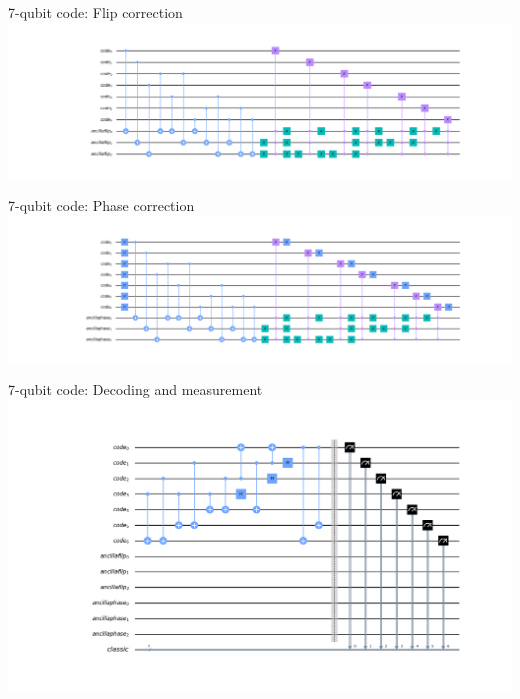 \documentclass{beamer}
\begin{document}
\begin{frame}{7-qubit code: Flip correction}
  \includegraphics[width=\textwidth]{7qb_flip}
\end{frame}

\begin{frame}{7-qubit code: Phase correction}
  \includegraphics[width=\textwidth]{7qb_phase}
\end{frame}

\begin{frame}{7-qubit code: Decoding and measurement}
  \includegraphics[width=\textwidth]{7qb_end}
\end{frame}
\end{document}
